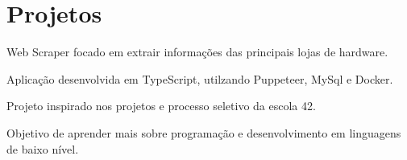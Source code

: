 \documentclass[]{deedy-resume-openfont}
\begin{document}
\begin{minipage}[t]{0.63\textwidth}

\section{Projetos} 
\begin{tightemize}
    \item Web Scraper focado em extrair informações das principais lojas de hardware.
    \item Aplicação desenvolvida em TypeScript, utilzando Puppeteer, MySql e Docker.
\end{tightemize}
\sectionsep

\begin{tightemize}
    \item Projeto inspirado nos projetos e processo seletivo da escola 42.
    \item Objetivo de aprender mais sobre programação e desenvolvimento em linguagens de baixo nível.
\end{tightemize}
\sectionsep

\end{minipage} 
\end{document}
